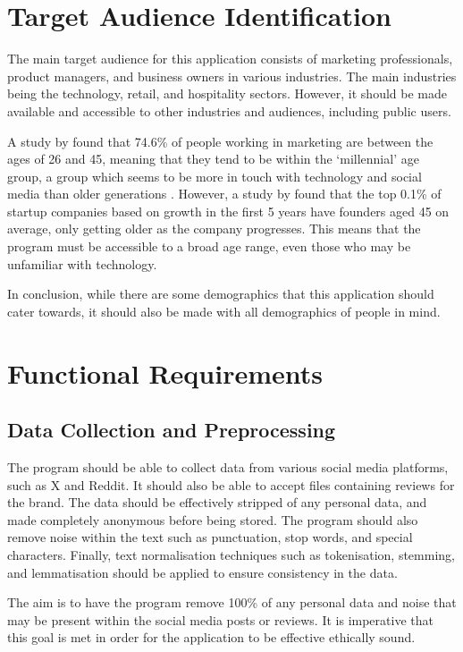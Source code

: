 \section{Target Audience Identification}
The main target audience for this application consists of marketing professionals, product managers, and business owners in various industries. The main industries being the technology, retail, and hospitality sectors. However, it should be made available and accessible to other industries and audiences, including public users.

A study by \citet{marketing2023survey} found that 74.6\% of people working in marketing are between the ages of 26 and 45, meaning that they tend to be within the `millennial' age group, a group which seems to be more in touch with technology and social media than older generations \citep{pew2019millennials}. However, a study by \citet{harvard2018research} found that the top 0.1\% of startup companies based on growth in the first 5 years have founders aged 45 on average, only getting older as the company progresses. This means that the program must be accessible to a broad age range, even those who may be unfamiliar with technology.

In conclusion, while there are some demographics that this application should cater towards, it should also be made with all demographics of people in mind.

\section{Functional Requirements}

    \subsection{Data Collection and Preprocessing}
    The program should be able to collect data from various social media platforms, such as X and Reddit. It should also be able to accept  files containing reviews for the brand. The data should be effectively stripped of any personal data, and made completely anonymous before being stored. The program should also remove noise within the text such as punctuation, stop words, and special characters. Finally, text normalisation techniques such as tokenisation, stemming, and lemmatisation should be applied to ensure consistency in the data.

    The aim is to have the program remove 100\% of any personal data and noise that may be present within the social media posts or reviews. It is imperative that this goal is met in order for the application to be effective ethically sound.

